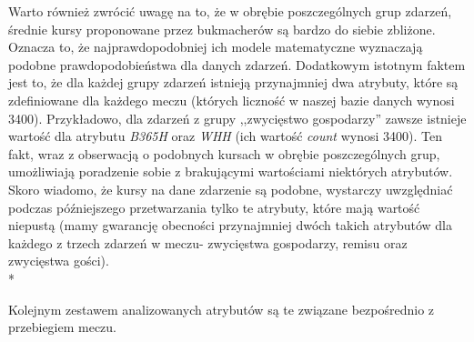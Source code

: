     Warto również zwrócić uwagę na to, że w obrębie poszczególnych grup zdarzeń, średnie kursy proponowane przez bukmacherów są bardzo do siebie zbliżone. Oznacza to, że najprawdopodobniej ich modele matematyczne wyznaczają podobne prawdopodobieństwa dla danych zdarzeń. Dodatkowym istotnym faktem jest to, że dla każdej grupy zdarzeń istnieją przynajmniej dwa atrybuty, które są zdefiniowane dla każdego meczu (których liczność w naszej bazie danych wynosi 3400). Przykładowo, dla zdarzeń z grupy ,,zwycięstwo gospodarzy'' zawsze istnieje wartość dla atrybutu \emph{B365H} oraz \emph{WHH} (ich wartość \emph{count} wynosi 3400). Ten fakt, wraz z obserwacją o podobnych kursach w obrębie poszczególnych grup, umożliwiają poradzenie sobie z brakującymi wartościami niektórych atrybutów. Skoro wiadomo, że kursy na dane zdarzenie są podobne, wystarczy uwzględniać podczas późniejszego przetwarzania tylko te atrybuty, które mają wartość niepustą (mamy gwarancję obecności przynajmniej dwóch takich atrybutów dla każdego z trzech zdarzeń w meczu- zwycięstwa gospodarzy, remisu oraz zwycięstwa gości). \\*
    
    \noindent Kolejnym zestawem analizowanych atrybutów są te związane bezpośrednio z przebiegiem meczu. 
    
